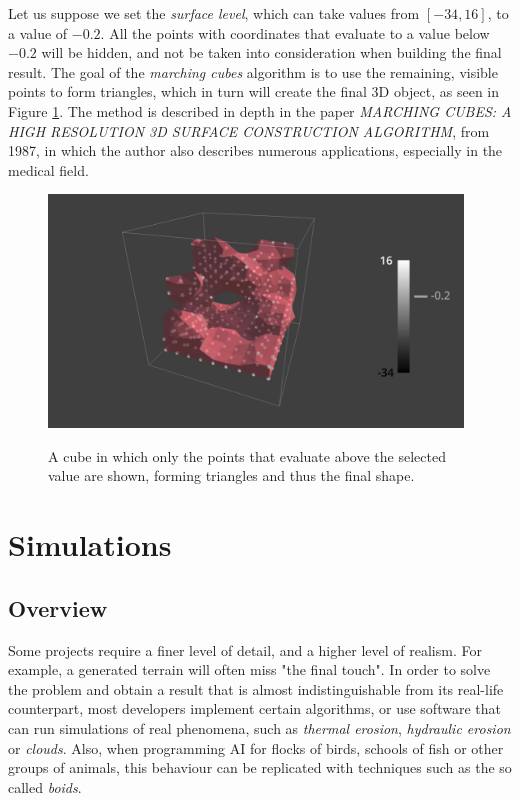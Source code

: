 Let us suppose we set the \textit{surface level}, which can take values from \([-34, 16]\), to a value of \(-0.2\). All the points with coordinates that evaluate to a value below \(-0.2\) will be hidden, and not be taken into consideration when building the final result. The goal of the \textit{marching cubes} algorithm is to use the remaining, visible points to form triangles, which in turn will create the final 3D object, as seen in Figure \ref{fig:marchingCubesResult}. The method is described in depth in the paper \textit{MARCHING CUBES: A HIGH RESOLUTION 3D SURFACE CONSTRUCTION ALGORITHM}\cite{lorensen1987marching}, from 1987, in which the author also describes numerous applications, especially in the medical field.

\begin{figure}[htp]
    \centering
    \includegraphics[width = 11cm]{figures/marchingCubesResult.png}
    \caption{A cube in which only the points that evaluate above the selected value are shown, forming triangles and thus the final shape.}
    \cite{marchingCubes}
    \label{fig:marchingCubesResult}
\end{figure}

\section{Simulations}

\subsection{Overview}

Some projects require a finer level of detail, and a higher level of realism. For example, a generated terrain will often miss "the final touch". In order to solve the problem and obtain a result that is almost indistinguishable from its real-life counterpart, most developers implement certain algorithms, or use software that can run simulations of real phenomena, such as \textit{thermal erosion}, \textit{hydraulic erosion} or \textit{clouds}. Also, when programming AI for flocks of birds, schools of fish or other groups of animals, this behaviour can be replicated with techniques such as the so called \textit{boids}.

